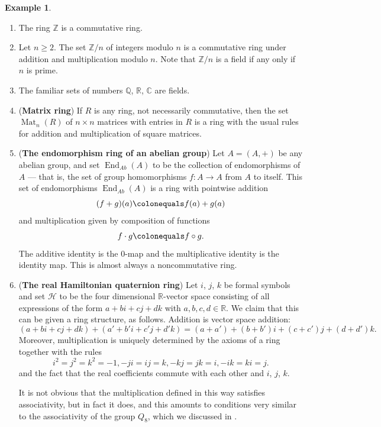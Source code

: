 \documentclass[12pt]{report}
\numberwithin{equation}{section}
\numberwithin{theorem}{chapter}
\theoremstyle{definition}
\newtheorem{example}[theorem]{Example}
\newtheorem*{basic properties}{Basic Properties}
\newtheorem*{Important Remark}{Important Remark}
\newcommand{\R}{\mathbb{R}}
\newcommand{\Z}{\mathbb{Z}}
\newcommand{\Q}{\mathbb{Q}}
\newcommand{\C}{\mathbb{C}}
\DeclareMathOperator{\Mat}{Mat}
\DeclareMathOperator{\End}{End}
\begin{document}
\begin{example}
\begin{enumerate}[itemsep=0.2em,leftmargin=20pt]
\item The ring $\Z$ is a commutative ring.

\item Let $n \geqslant 2$. The set $\Z/n$ of integers modulo $n$ is a commutative ring under addition and multiplication modulo $n$. Note that $\Z/n$ is a field if any only if $n$ is prime.

\item The familiar sets of numbers $\Q$, $\R$, $\C$ are fields.


\item ({\bf Matrix ring})\index{$\Mat_n(R)$} If $R$ is any ring, not necessarily commutative, then the set $\Mat_{n}(R)$ of $n \times n$ matrices with entries in $R$ is a ring with the usual rules for addition and multiplication of square matrices.

\item ({\bf The endomorphism ring of an abelian group}) Let $A = (A, +)$ be any abelian group, and set $\End_{Ab}(A)$ to be the collection of endomorphisms of $A$ --- that is, the set of group homomorphisms $f\!: A \longrightarrow A$ from $A$ to itself. 
This set of endomorphisms $\End_{Ab}(A)$ is a ring with pointwise addition 
$$(f + g)(a) \colonequals f(a) + g(a)$$ 
and multiplication given by composition of functions
$$f \cdot g \colonequals f \circ g.$$ 
The additive identity is the $0$-map and the multiplicative identity is the identity map. 
This is almost always a noncommutative ring.


\item ({\bf The real Hamiltonian quaternion ring}) Let $i$, $j$, $k$ be formal symbols and set $\mathcal{H}$ to be the four dimensional $\R$-vector space consisting of all expressions of the form $a + bi + cj + dk$ with $a,b,c,d \in \R$. We claim that this can be given a ring structure, as follows. Addition is vector space addition:
$$(a + bi + cj + dk) +(a' + b'i + c'j + d'k) = (a + a') + (b + b') i + (c + c')j + (d + d')k.$$
Moreover, multiplication is uniquely determined by the axioms of a ring together with the rules
$$i^2 = j^2 = k^2 = -1, -ji = ij = k, -kj = jk = i, -ik = ki = j.$$
and the fact that the real coefficients commute with each other and $i$, $j$, $k$.

It is not obvious that the multiplication defined in this way satisfies associativity, but in fact it does, and this amounts to conditions very similar to the associativity of the group $Q_8$, which we discussed in . 


\end{enumerate}
\end{example}
\end{document}
